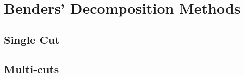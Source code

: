 
\chapter{Benders' Decomposition Methods} %

\label{Chapter3} %
\section{Single Cut}
\section{Multi-cuts}

\newcommand{\keyword}[1]{\textbf{#1}}
\newcommand{\tabhead}[1]{\textbf{#1}}
\newcommand{\code}[1]{\texttt{#1}}
\newcommand{\file}[1]{\texttt{\bfseries#1}}
\newcommand{\option}[1]{\texttt{\itshape#1}}




